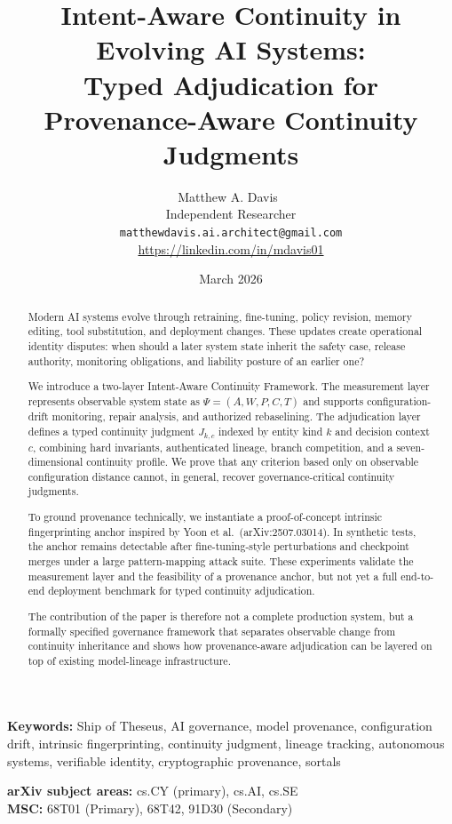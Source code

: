\documentclass[11pt,a4paper]{article}
\title{Intent-Aware Continuity in Evolving AI Systems:\\
Typed Adjudication for Provenance-Aware Continuity Judgments}
\author{Matthew A. Davis~\orcidlink{0009-0000-4309-3874} \\
Independent Researcher \\
\texttt{matthewdavis.ai.architect@gmail.com} \\
\url{https://linkedin.com/in/mdavis01}}
\date{March 2026}
\begin{document}
\maketitle

\begin{abstract}
Modern AI systems evolve through retraining, fine-tuning, policy revision, memory editing, tool substitution, and deployment changes. These updates create operational identity disputes: when should a later system state inherit the safety case, release authority, monitoring obligations, and liability posture of an earlier one?

We introduce a two-layer Intent-Aware Continuity Framework. The measurement layer represents observable system state as \(\Psi = (A,W,P,C,T)\) and supports configuration-drift monitoring, repair analysis, and authorized rebaselining. The adjudication layer defines a typed continuity judgment \(J_{k,c}\) indexed by entity kind \(k\) and decision context \(c\), combining hard invariants, authenticated lineage, branch competition, and a seven-dimensional continuity profile. We prove that any criterion based only on observable configuration distance cannot, in general, recover governance-critical continuity judgments.

To ground provenance technically, we instantiate a proof-of-concept intrinsic fingerprinting anchor inspired by Yoon et al.~(arXiv:2507.03014). In synthetic tests, the anchor remains detectable after fine-tuning-style perturbations and checkpoint merges under a large pattern-mapping attack suite. These experiments validate the measurement layer and the feasibility of a provenance anchor, but not yet a full end-to-end deployment benchmark for typed continuity adjudication.

The contribution of the paper is therefore not a complete production system, but a formally specified governance framework that separates observable change from continuity inheritance and shows how provenance-aware adjudication can be layered on top of existing model-lineage infrastructure.
\end{abstract}

\noindent\textbf{Keywords:} Ship of Theseus, AI governance, model provenance, configuration drift, intrinsic fingerprinting, continuity judgment, lineage tracking, autonomous systems, verifiable identity, cryptographic provenance, sortals

\noindent\textbf{arXiv subject areas:} cs.CY (primary), cs.AI, cs.SE \\
\noindent\textbf{MSC:} 68T01 (Primary), 68T42, 91D30 (Secondary)
\end{document}

